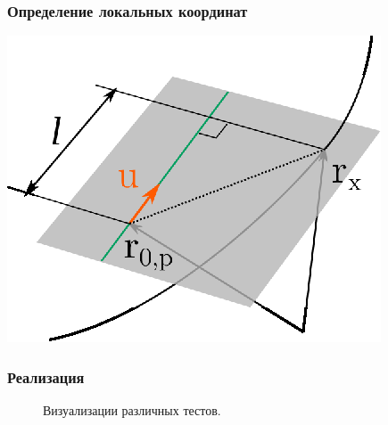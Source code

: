 \subsubsection{Определение локальных координат}

\begin{center}
\includegraphics[width=.5\textwidth]{images/arttrack/arttrack-u-measurement.eps}
\end{center}

\subsubsection{Реализация}

\begin{figure}[ht]
    \centering
    \caption{Визуализации различных тестов.}
    \label{fig:boxInSphere}
\end{figure}